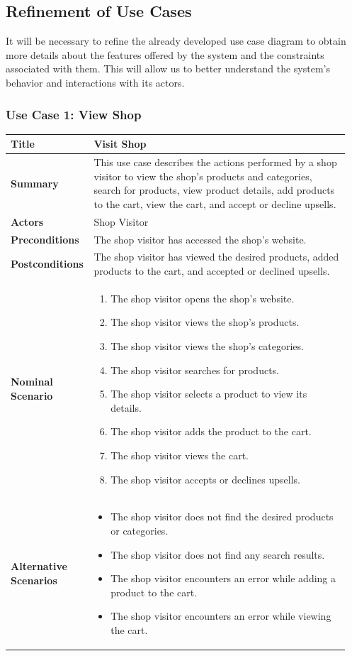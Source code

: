 \subsection{Refinement of Use Cases}
It will be necessary to refine the already developed use case diagram to obtain more details about the features offered by the system and the constraints associated with them. This will allow us to better understand the system's behavior and interactions with its actors.

\subsubsection{Use Case 1: View Shop}
\begin{longtable}{|p{0.2\linewidth}|p{0.75\linewidth}|}
\hline
\textbf{Title} & Visit Shop \\
\hline
\textbf{Summary} & This use case describes the actions performed by a shop visitor to view the shop's products and categories, search for products, view product details, add products to the cart, view the cart, and accept or decline upsells. \\
\hline
\textbf{Actors} & Shop Visitor \\
\hline
\textbf{Preconditions} & The shop visitor has accessed the shop's website. \\
\hline
\textbf{Postconditions} & The shop visitor has viewed the desired products, added products to the cart, and accepted or declined upsells. \\
\hline
\textbf{Nominal Scenario} & 
\begin{enumerate}
    \item The shop visitor opens the shop's website.
    \item The shop visitor views the shop's products.
    \item The shop visitor views the shop's categories.
    \item The shop visitor searches for products.
    \item The shop visitor selects a product to view its details.
    \item The shop visitor adds the product to the cart.
    \item The shop visitor views the cart.
    \item The shop visitor accepts or declines upsells.
\end{enumerate} \\
\hline
\textbf{Alternative Scenarios} & 
\begin{itemize}
    \item The shop visitor does not find the desired products or categories.
    \item The shop visitor does not find any search results.
    \item The shop visitor encounters an error while adding a product to the cart.
    \item The shop visitor encounters an error while viewing the cart.
\end{itemize} \\
\hline
\end{longtable}

